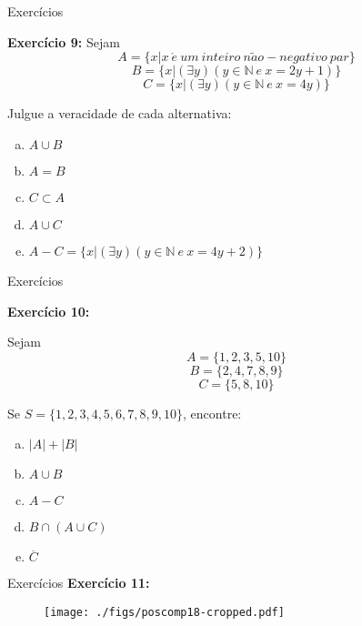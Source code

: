 \documentclass[aspectratio=169]{beamer}
\begin{document}
\begin{frame}{Exercícios}

    \textbf{Exercício 9: }
    Sejam
\[ A = \{x | x ~ \acute{e} ~ um ~ inteiro ~ n\tilde{a}o - negativo ~ par \} \]
\[ B = \{x | (\exists y) (y \in \mathbb{N} ~ e ~ x = 2y + 1 )\} \]
\[ C = \{x|(\exists y)(y \in \mathbb{N} ~ e ~ x = 4y)\} \]

Julgue a veracidade de cada alternativa:

\begin{enumerate}[a)]
    \item $A \cup B$
    \item $A = B$
    \item $ C \subset A$
    \item $A \cup C$
    \item $A - C = \{x|(\exists y)(y \in \mathbb{N} ~ e ~ x = 4y + 2)\}$
\end{enumerate}
\end{frame}


\begin{frame}{Exercícios}

    \textbf{Exercício 10: }

    Sejam
\[ A = \{1,2,3,5,10\} \]
\[ B = \{2,4,7,8,9\} \]
\[ C = \{5,8,10\} \]

Se $S=\{1,2,3,4,5,6,7,8,9,10\}$, encontre:

\begin{enumerate}[a)]   
    \item $|A| + |B|$
    \item $A \cup B$
    \item $A - C$
    \item $B \cap (A \cup C)$
    \item $\overline{C}$
\end{enumerate}
\end{frame}


\begin{frame}{Exercícios}
    \textbf{Exercício 11: }
\begin{figure}
    \texttt{[image: ./figs/poscomp18-cropped.pdf]}
\end{figure}
\end{frame}
\end{document}
